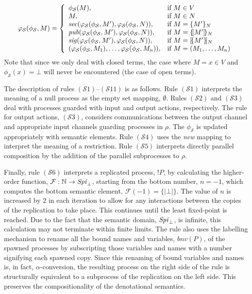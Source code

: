 \documentclass{entcs} \usepackage{entcsmacro}
\begin{document}
\noindent
\[\varphi_\mathcal{S}(\phi_\mathcal{S},M)=\left\{\begin{array}{ll}\phi_\mathcal{S}(M),&\mbox{if }M\in V\\
M,&\mbox{if }M\in N\\
\mbox{{\itshape sec\/}}(\varphi_\mathcal{S}(\phi_\mathcal{S},M'),\varphi_\mathcal{S}(\phi_\mathcal{S},N)),&\mbox{if }M=\{M'\}_{N}\\
\mbox{{\itshape pub\/}}(\varphi_\mathcal{S}(\phi_\mathcal{S},M'),\varphi_\mathcal{S}(\phi_\mathcal{S},N)),&\mbox{if }M=\{\![M']\!\}_{N}\\
\mbox{{\itshape sig\/}}(\varphi_\mathcal{S}(\phi_\mathcal{S},M'),\varphi_\mathcal{S}(\phi_\mathcal{S},N)),&\mbox{if }M=[\!\{M'\}\!]_{N}\\
(\varphi_\mathcal{S}(\phi_\mathcal{S},M_1),\ldots,\varphi_\mathcal{S}(\phi_\mathcal{S},M_n)),&\mbox{if }M=(M_1,\ldots,M_n)\\

\end{array}\right.\]
Note that since we only deal with closed terms, the case where $M=x\in V$ and $\phi_\mathcal{S}(x)=\bot$ will never be encountered (the case of open terms).

The description of rules $(\mathcal{S}1)$--$(\mathcal{S}11)$ is as follows.  Rule $(\mathcal{S}1)$ interprets the meaning of a null process as the empty set mapping, $\emptyset$.  Rules $(\mathcal{S}2)$ and $(\mathcal{S}3)$ deal with processes guarded with input and output actions, respectively.  The rule for output actions, $(\mathcal{S}3)$, considers communications between the output channel and appropriate input channels guarding processes in $\rho$.  The $\phi_\mathcal{S}$ is updated appropriately with semantic elements. Rule $(\mathcal{S}4)$ uses the {\itshape new\/} mapping to interpret the meaning of a restriction. Rule $(\mathcal{S}5)$ interprets directly parallel composition by the addition of the parallel subprocesses to $\rho$.

Finally, rule $(\mathcal{S}6)$ interprets a replicated process, $!P$, by calculating the higher-order function, $\mathcal{F}:\mathbb{N}\to\mbox{{\itshape Spi\/}}_\bot$, starting from the bottom number, $n=-1$, which computes the bottom semantic element, $\mathcal{F}(-1)=\{\!|\bot|\!\}$. The value of $n$ is increased by $2$ in each iteration to allow for any interactions between the copies of the replication to take place.  This continues until the least fixed-point is reached. Due to the fact that the semantic domain, $\mbox{{\itshape Spi\/}}_\bot$, is infinite, this calculation may not terminate within finite limits.  The rule also uses the labelling mechanism to rename all the bound names and variables, $bnv(P)$, of the spawned processes by subscripting those variables and names with a number signifying each spawned copy. Since this renaming of bound variables and names is, in fact, $\alpha$-conversion, the resulting process on the right side of the rule is structurally equivalent to a subprocess of the replication on the left side. This preserves the compositionality of the denotational semantics.
\end{document}
